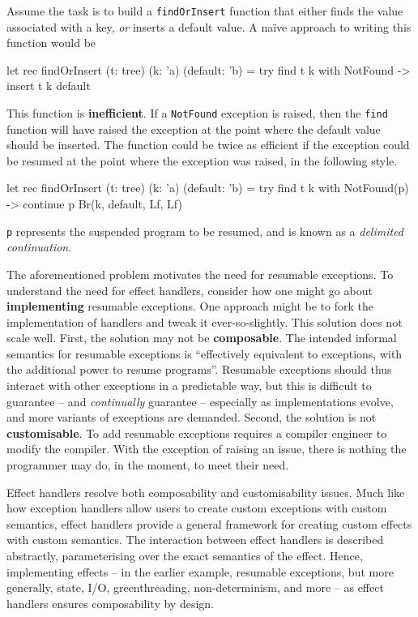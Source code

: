 Assume the task is to build a \texttt{findOrInsert} function that either finds the value associated with a key, \textit{or} inserts a default value. A naïve approach to writing this function would be
\begin{ocaml}  
let rec findOrInsert (t: tree) (k: 'a) (default: 'b) = 
  try find t k with NotFound -> insert t k default
\end{ocaml}
This function is \textbf{inefficient}. If a \texttt{NotFound} exception is raised, then the \texttt{find} function will have raised the exception at the point where the default value should be inserted. The function could be twice as efficient if the exception could be resumed at the point where the exception was raised, in the following style.
\begin{ocaml}
let rec findOrInsert (t: tree) (k: 'a) (default: 'b) = 
  try find t k with NotFound(p) -> continue p Br(k, default, Lf, Lf)
\end{ocaml}
\texttt{p} represents the suspended program to be resumed, and is known as a \textit{delimited continuation}.

The aforementioned problem motivates the need for resumable exceptions. To understand the need for effect handlers, consider how one might go about \textbf{implementing} resumable exceptions. One approach might be to fork the implementation of handlers and tweak it ever-so-slightly. This solution does not scale well. First, the solution may not be \textbf{composable}. The intended informal semantics for resumable exceptions is ``effectively equivalent to exceptions, with the additional power to resume programs''. Resumable exceptions should thus interact with other exceptions in a predictable way, but this is difficult to guarantee -- and \textit{continually} guarantee -- especially as implementations evolve, and more variants of exceptions are demanded. Second, the solution is not \textbf{customisable}. To add resumable exceptions requires a compiler engineer to modify the compiler. With the exception of raising an issue, there is nothing the programmer may do, in the moment, to meet their need.

Effect handlers resolve both composability and customisability issues. Much like how exception handlers allow users to create custom exceptions with custom semantics, effect handlers provide a general framework for creating custom effects with custom semantics. The interaction between effect handlers is described abstractly, parameterising over the exact semantics of the effect. Hence, implementing effects -- in the earlier example, resumable exceptions, but more generally, state, I/O, greenthreading, non-determinism, and more -- as effect handlers ensures composability by design. 


